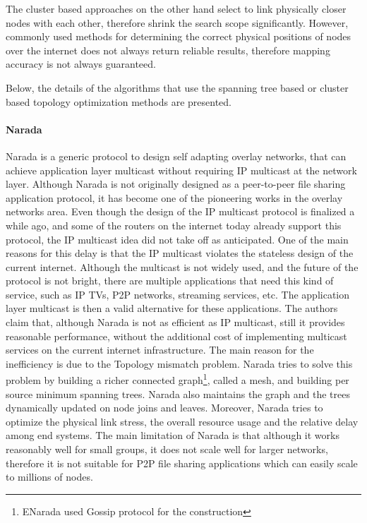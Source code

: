 \documentclass[acmcsur]{acmtrans2m}
\begin{document}
The cluster based approaches on the other hand select to link physically closer
nodes with each other, therefore shrink the search scope significantly. However,
commonly used methods for determining the correct physical positions of nodes
over the internet does not always return reliable results, therefore mapping
accuracy is not always guaranteed.

Below, the details of the algorithms that use the spanning tree based or cluster
based topology optimization methods are presented.

\paragraph*{\bf Narada}

Narada \cite{chu_esm_2000,chu_esm_2001,chu_esm_2002} is a generic protocol to
design self adapting overlay networks, that can achieve application layer
multicast without requiring IP multicast at the network layer. Although Narada
is not originally designed as a peer-to-peer file sharing application protocol,
it has become one of the pioneering works in the overlay networks area.  Even
though the design of the IP multicast protocol is finalized a while ago, and
some of the routers on the internet today already support this protocol, the IP
multicast idea did not take off as anticipated. One of the main reasons for this
delay is that the IP multicast violates the stateless design of the current
internet. Although the multicast is not widely used, and the future of the
protocol is not bright, there are multiple applications that need this kind of
service, such as IP TVs, P2P networks, streaming services, etc. The application
layer multicast is then a valid alternative for these applications.  The authors
claim that, although Narada is not as efficient as IP multicast, still it
provides reasonable performance, without the additional cost of implementing
multicast services on the current internet infrastructure. The main reason for
the inefficiency is due to the Topology mismatch problem.  Narada tries to solve
this problem by building a richer connected graph\footnote{ENarada
\cite{li_enarada_2008} used Gossip protocol for the construction}, called a
mesh, and building per source minimum spanning trees.  Narada also maintains the
graph and the trees dynamically updated on node joins and leaves. Moreover, Narada tries
to optimize the physical link stress, the overall resource usage and the
relative delay among end systems. The main limitation of Narada is that although
it works reasonably well for small groups, it does not scale well for larger
networks, therefore it is not suitable for P2P file sharing applications which
can easily scale to millions of nodes.
\end{document}
